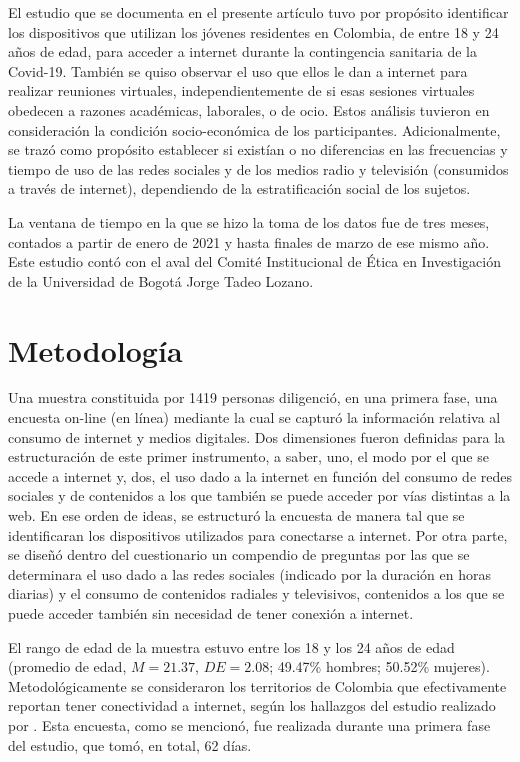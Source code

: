 \documentclass[spanish]{textolivre}
\begin{document}
El estudio que se documenta en el presente artículo tuvo por propósito identificar los dispositivos que utilizan los jóvenes residentes en Colombia, de entre 18 y 24 años de edad, para acceder a internet durante la contingencia sanitaria de la Covid-19. También se quiso observar el uso que ellos le dan a internet para realizar reuniones virtuales, independientemente de si esas sesiones virtuales obedecen a razones académicas, laborales, o de ocio. Estos análisis tuvieron en consideración la condición socio-económica de los participantes. Adicionalmente, se trazó como propósito establecer si existían o no diferencias en las frecuencias y tiempo de uso de las redes sociales y de los medios radio y televisión (consumidos a través de internet), dependiendo de la estratificación social de los sujetos.

La ventana de tiempo en la que se hizo la toma de los datos fue de tres meses, contados a partir de enero de 2021 y hasta finales de marzo de ese mismo año. Este estudio contó con el aval del Comité Institucional de Ética en Investigación de la Universidad de Bogotá Jorge Tadeo Lozano. 

\section{Metodología}
Una muestra constituida por 1419 personas diligenció, en una primera fase, una encuesta on-line (en línea) mediante la cual se capturó la información relativa al consumo de internet y medios digitales. Dos dimensiones fueron definidas para la estructuración de este primer instrumento, a saber, uno, el modo por el que se accede a internet y, dos, el uso dado a la internet en función del consumo de redes sociales y de contenidos a los que también se puede acceder por vías distintas a la web. En ese orden de ideas, se estructuró la encuesta de manera tal que se identificaran los dispositivos utilizados para conectarse a internet. Por otra parte, se diseñó dentro del cuestionario un compendio de preguntas por las que se determinara el uso dado a las redes sociales (indicado por la duración en horas diarias) y el consumo de contenidos radiales y televisivos, contenidos a los que se puede acceder también sin necesidad de tener conexión a internet.

El rango de edad de la muestra estuvo entre los 18 y los 24 años de edad (promedio de edad, $M = 21.37$, $DE = 2.08$; 49.47\% hombres; 50.52\% mujeres). Metodológicamente se consideraron los territorios de Colombia que efectivamente reportan tener conectividad a internet, según los hallazgos del estudio realizado por \textcite{arango2020}. Esta encuesta, como se mencionó, fue realizada durante una primera fase del estudio, que tomó, en total, 62 días.
\end{document}

